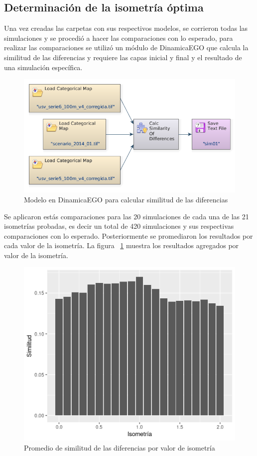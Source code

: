 \documentclass[12pt,a4paper,oldfontcommands]{article}
\begin{document}
\subsection{Determinación de la isometría óptima}
Una vez creadas las carpetas con sus respectivos modelos, se corrieron todas las simulaciones y se procedió a hacer las comparaciones con lo esperado, para realizar las comparaciones se utilizó un módulo de DinamicaEGO que calcula la similitud de las diferencias y requiere las capas inicial y final y el resultado de una simulación específica.
\begin{figure}[h]
	\centering
	\includegraphics[width=1\textwidth]{./figuras/similitud.png}
	\caption{Modelo en DinamicaEGO para calcular similitud de las diferencias}
\end{figure}
\bigskip
Se aplicaron estás comparaciones para las 20 simulaciones de cada una de las 21 isometrías probadas, es decir un total de 420 simulaciones y sus respectivas comparaciones con lo esperado. Posteriormente se promediaron los resultados por cada valor de la isometría. La figura ~\ref{fig:isometria} muestra los resultados agregados por valor de la isometría.
\begin{figure}[h]
	\centering
	\includegraphics[width=1\textwidth]{./figuras/similitud_isometria.png}
	\caption{Promedio de similitud de las diferencias por valor de isometría}
	\label{fig:isometria}
\end{figure}
\bigskip
\end{document}
